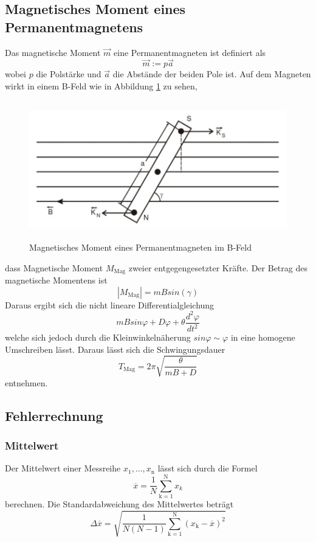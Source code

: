 \subsection{Magnetisches Moment eines Permanentmagnetens}
Das magnetische Moment $\vec{m}$  eine Permanentmagneten ist definiert als
\begin{equation}
  \vec{m} := p \vec{a}
  \label{eqn:m}
\end{equation}
wobei $p$ die Polstärke und $\vec{a}$ die Abstände der beiden Pole ist. Auf dem Magneten wirkt in einem B-Feld wie in Abbildung \ref{fig:MagM} zu sehen, 
\begin{figure}
  \centering
  \includegraphics[height=6cm]{picture/MagM.png}
  \caption{Magnetisches Moment eines Permanentmagneten im B-Feld}
  \label{fig:MagM}
\end{figure}
dass Magnetische Moment $M_\text{Mag}$ zweier entgegengesetzter Kräfte. Der Betrag des magnetische Momentens ist
\begin{equation}
  |M_\text{Mag}| = m B sin(\gamma)
  \label{eqn:MM}
\end{equation}
Daraus ergibt sich die nicht lineare Differentialgleichung
\begin{equation}
  mBsin \varphi + D \varphi + \theta \frac{d^2 \varphi}{dt^2}
  \label{eqn:idgl}
\end{equation} welche sich jedoch durch die Kleinwinkelnäherung $sin \varphi \sim \varphi$ in eine homogene Umschreiben lässt. Daraus lässt sich die Schwingungsdauer
\begin{equation}
  T_\text{Mag} = 2 \pi \sqrt{\frac{\theta}{mB + D}}
  \label{eqn:Tmag}
\end{equation}
entnehmen.
\subsection{Fehlerrechnung}
\subsubsection{Mittelwert}
Der Mittelwert einer Messreihe $x_\text{1}, ... ,x_\text{n}$ lässt sich durch die Formel
\begin{equation}
	\overline{x} = \frac{1}{N} \sum_{\text{k}=1}^\text{N} x_k
	\label{eqn:ave}
\end{equation}
berechnen. Die Standardabweichung des Mittelwertes beträgt
\begin{equation}
	\Delta \overline{x} = \sqrt{ \frac{1}{N(N-1)} \sum_{\text{k}=1}^\text{N} (x_\text{k} - \overline{x})^2}
	\label{eqn:std}
\end{equation}

